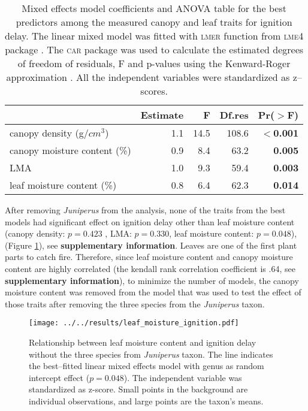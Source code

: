 \documentclass{bmcart}
\newcommand{\pkg}[1]{\textsc{#1}}
\begin{document}
\begin{table}[ht]
  \centering
  \caption{Mixed effects model coefficients and ANOVA table for the best
    predictors among the measured canopy and leaf traits for ignition delay.
    The linear mixed model was fitted with \pkg{lmer} function from \pkg{lme4}
    package \citep{bates2009package}. The \pkg{car} package
    \citep{fox2013hypothesis} was used to calculate the estimated degrees of
    freedom of residuals, F and p-values using the Kenward-Roger approximation
    \citep{kenward1997small}. All the independent variables were standardized
    as z--scores.}
  \begin{tabular}{lrrrr}
    \toprule
    & Estimate & F & Df.res & Pr($>$F) \\ 
    \midrule
    canopy density (g/{$cm^3$}) & 1.1 & 14.5  & 108.6 & \textbf{$<$0.001} \\ 
    canopy moisture content (\%) & 0.9 & 8.4 & 63.2 & \textbf{0.005} \\ 
    LMA & 1.0 & 9.3  & 59.4 & \textbf{0.003} \\  
    leaf moisture content (\%) & 0.8 & 6.4  & 62.3 & \textbf{0.014} \\ 
    \bottomrule
  \end{tabular}
  \label{tab:fandpforig_delay}
\end{table}
After removing \emph{Juniperus} from the analysis, none of the traits from the best models had significant effect on ignition delay other than leaf moisture content (canopy density: $p = 0.423$ , LMA: $p = 0.330$, leaf moisture content: $p = 0.048$), (Figure \ref{fig:leafmc_ig_delay}), see \textbf{supplementary information}. Leaves are one of the first plant parts to catch fire. Therefore, since leaf moisture content and canopy moisture content are highly correlated (the kendall rank correlation coefficient is .64, see \textbf{supplementary information}), to minimize the number of models, the canopy moisture content was removed from the model that was used to test the effect of those traits after removing the three species from the \emph{Juniperus} taxon.

\begin{figure}[ht]
  \centering \texttt{[image: ../../results/leaf\_moisture\_ignition.pdf]}
  \caption[Leaf moisture content effect on ignition delay]{\label{fig:leafmc_ig_delay}Relationship between leaf moisture content and ignition delay without the three species from \emph{Juniperus} taxon. The line indicates the best--fitted linear mixed effects model with genus as random intercept effect ($p = 0.048$). The independent variable was standardized  as z-score. Small points in the background are individual observations, and large points are the taxon's means.} 
\end{figure}
\end{document}
